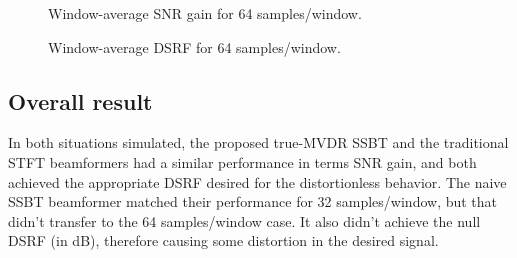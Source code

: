 

\begin{figure}[H]
\centering

\caption{Window-average SNR gain for 64 samples/window.}
\label{fig:lineplot_gain_64}
\end{figure}

\begin{figure}[H]
	\centering
	
	\caption{Window-average DSRF for 64 samples/window.}
	\label{fig:lineplot_dsrf_64}
\end{figure}

%

\subsection{Overall result}

In both situations simulated, the proposed true-MVDR SSBT and the traditional STFT beamformers had a similar performance in terms SNR gain, and both achieved the appropriate DSRF desired for the distortionless behavior. The naive SSBT beamformer matched their performance for 32 samples/window, but that didn't transfer to the 64 samples/window case. It also didn't achieve the null DSRF (in dB), therefore causing some distortion in the desired signal.